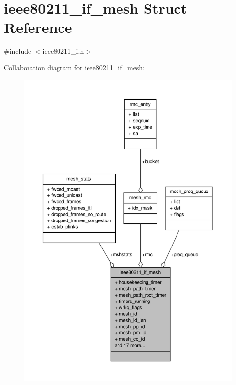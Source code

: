 \hypertarget{structieee80211__if__mesh}{\section{ieee80211\-\_\-if\-\_\-mesh Struct Reference}
\label{structieee80211__if__mesh}
}


{\ttfamily \#include $<$ieee80211\-\_\-i.\-h$>$}



Collaboration diagram for ieee80211\-\_\-if\-\_\-mesh\-:
\nopagebreak
\begin{figure}[H]
\begin{center}
\leavevmode
\includegraphics[width=350pt]{structieee80211__if__mesh__coll__graph}
\end{center}
\end{figure}
